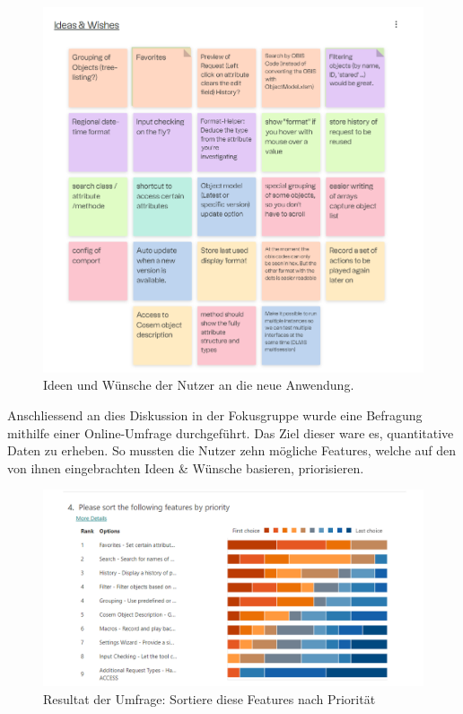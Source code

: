 \begin{figure}[H]
   \centering
   \includegraphics[width=1.0\textwidth]{gfx/S1_RetroBoard_IdeasAndWishes.png}
   \caption{
       Ideen und Wünsche der Nutzer an die neue Anwendung.
   }
   \label{fig:IdeasAndWishes}
\end{figure}
Anschliessend an dies Diskussion in der Fokusgruppe wurde eine Befragung mithilfe einer Online-Umfrage durchgeführt.
Das Ziel dieser ware es, quantitative Daten zu erheben.
So mussten die Nutzer zehn mögliche Features, welche auf den von ihnen eingebrachten Ideen \& Wünsche basieren, priorisieren.


\begin{figure}[H]
   \centering
   \includegraphics[width=1.0\textwidth]{gfx/S1_Survey_Prio.png}
   \caption{
       Resultat der Umfrage: Sortiere diese Features nach Priorität
   }
   \label{fig:FeaturesPrio}
\end{figure}

